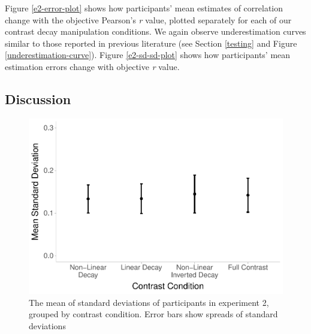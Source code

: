 \documentclass[preprint, 3p,
authoryear]{elsarticle} %
\begin{document}
Figure \ref{e2-error-plot} shows how participants' mean estimates of
correlation change with the objective Pearson's \emph{r} value, plotted
separately for each of our contrast decay manipulation conditions. We
again observe underestimation curves similar to those reported in
previous literature (see Section \ref{testing} and Figure
\ref{underestimation-curve}). Figure \ref{e2-sd-sd-plot} shows how
participants' mean estimation errors change with objective \emph{r}
value.

\hypertarget{discussion-1}{%
\subsection{Discussion}\label{discussion-1}}

\begin{figure}

\includegraphics[width=0.5\linewidth]{contrast_and_scatterplots_files/figure-latex/e2-sd-sd-plot-1} \hfill{}

\caption{\label{e2-sd-sd-plot}The mean of standard deviations of participants in experiment 2, grouped by contrast condition. Error bars show spreads of standard deviations}\label{fig:e2-sd-sd-plot}
\end{figure}
\end{document}
